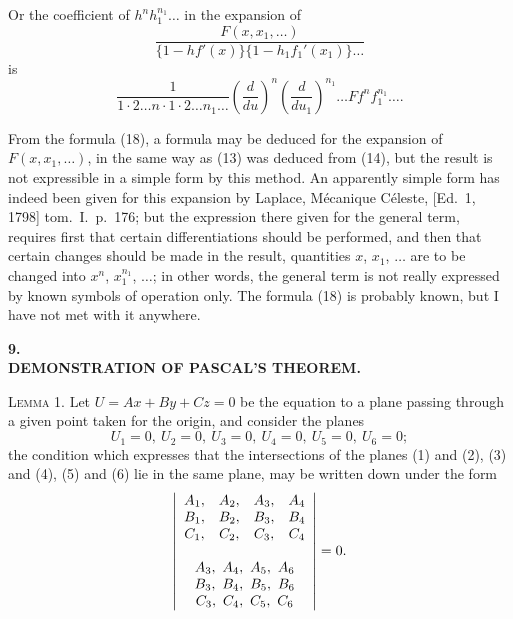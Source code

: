 \documentclass[11pt]{article}
\begin{document}
Or the coefficient of $h^n h_1^{n_1}\!\ldots$ in the expansion of
\[
\frac{F(x, x_1, \ldots)}{\{1 - h f'(x)\}\{1 - h_1 f_1'(x_1)\} \ldots} \tag{19}
\]
is
\[
\frac{1}{1 \cdot 2 \ldots n \cdot 1 \cdot 2 \ldots n_1 \ldots} \left(\frac{d}{du}\right)^{\!\!n}\!\!\left(\frac{d}{du_1}\right)^{\!\!n_1}\!\!\ldots F f^n f_1^{n_1}\!\ldots \tag{20}.
\]

From the formula (18), a formula may be deduced for the expansion of $F(x, x_1, \ldots)$, in the same way as (13) was deduced from (14), but the result is not expressible in a simple form by this method. An apparently simple form has indeed been given for this expansion by Laplace, M\'ecanique C\'eleste, [Ed.\ 1, 1798] tom.~I.\ p.~176; but the expression there given for the general term, requires first that certain differentiations should be performed, and then that certain changes should be made in the result, quantities $x$, $x_1$, $\ldots$ are to be changed into $x^n$, $x_1^{n_1}$, $\ldots$; in other words, the general term is not really expressed by known symbols of operation only. The formula (18) is probably known, but I have not met with it anywhere.

\bigskip

\begin{center}
\large\textbf{9.}\\[6pt]
\large\textbf{DEMONSTRATION OF PASCAL'S THEOREM.}
\end{center}


\medskip

\noindent\textsc{Lemma 1.} Let $U = Ax + By + Cz = 0$ be the equation to a plane passing through a given point taken for the origin, and consider the planes
\[
U_1 = 0,\ U_2 = 0,\ U_3 = 0,\ U_4 = 0,\ U_5 = 0,\ U_6 = 0;
\]
the condition which expresses that the intersections of the planes (1) and (2), (3) and (4), (5) and (6) lie in the same plane, may be written down under the form
\[
\left|\begin{array}{cccc}
A_1, & A_2, & A_3, & A_4 \\
B_1, & B_2, & B_3, & B_4 \\
C_1, & C_2, & C_3, & C_4 \\
\multicolumn{4}{c}{\ } \\
\multicolumn{4}{c}{A_3,\ A_4,\ A_5,\ A_6} \\
\multicolumn{4}{c}{B_3,\ B_4,\ B_5,\ B_6} \\
\multicolumn{4}{c}{C_3,\ C_4,\ C_5,\ C_6}
\end{array}\right| = 0.
\]
\end{document}
